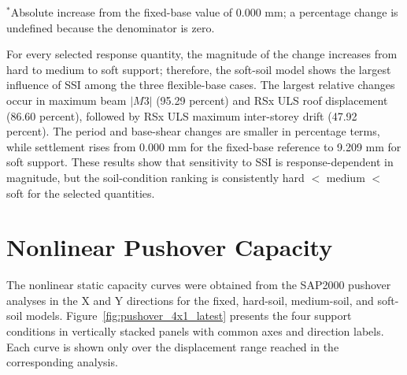 \begin{table}[htbp]
\caption{Variation of selected seismic response parameters relative to the fixed-base model}
\label{tab:ssi_sensitivity_linear}
\centering
{}
\par\smallskip
\noindent\footnotesize $^{*}$Absolute increase from the fixed-base value of 0.000 mm; a percentage change is undefined because the denominator is zero.
\end{table}

For every selected response quantity, the magnitude of the change increases from hard to medium to soft support; therefore, the soft-soil model shows the largest influence of SSI among the three flexible-base cases. The largest relative changes occur in maximum beam $|M3|$ (95.29 percent) and RSx ULS roof displacement (86.60 percent), followed by RSx ULS maximum inter-storey drift (47.92 percent). The period and base-shear changes are smaller in percentage terms, while settlement rises from 0.000 mm for the fixed-base reference to 9.209 mm for soft support. These results show that sensitivity to SSI is response-dependent in magnitude, but the soil-condition ranking is consistently hard $<$ medium $<$ soft for the selected quantities.

\section{Nonlinear Pushover Capacity}
The nonlinear static capacity curves were obtained from the SAP2000 pushover analyses in the X and Y directions for the fixed, hard-soil, medium-soil, and soft-soil models. Figure~\ref{fig:pushover_4x1_latest} presents the four support conditions in vertically stacked panels with common axes and direction labels. Each curve is shown only over the displacement range reached in the corresponding analysis.

